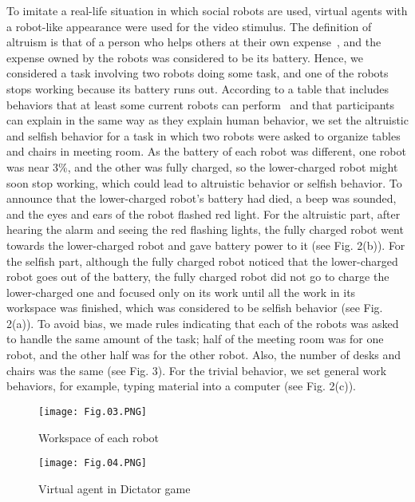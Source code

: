 \documentclass[runningheads]{llncs}
\begin{document}
To imitate a real-life situation in which social robots are used, virtual agents with a robot-like appearance were used for the video stimulus. The definition of altruism is that of a person who helps others at their own expense~\cite{ref_article22}, and the expense owned by the robots was considered to be its battery. Hence, we considered a task involving two robots doing some task, and one of the robots stops working because its battery runs out. According to a table that includes behaviors that at least some current robots can perform~\cite{ref_article35} and that participants can explain in the same way as they explain human behavior, we set the altruistic and selfish behavior for a task in which two robots were asked to organize tables and chairs in meeting room. As the battery of each robot was different, one robot was near 3\%, and the other was fully charged, so the lower-charged robot might soon stop working, which could lead to altruistic behavior or selfish behavior. To announce that the lower-charged robot's battery had died, a beep was sounded, and the eyes and ears of the robot flashed red light. For the altruistic part, after hearing the alarm and seeing the red flashing lights, the fully charged robot went towards the lower-charged robot and gave battery power to it (see Fig. 2(b)). For the selfish part, although the fully charged robot noticed that the lower-charged robot goes out of the battery, the fully charged robot did not go to charge the lower-charged one and focused only on its work until all the work in its workspace was finished, which was considered to be selfish behavior (see Fig. 2(a)). To avoid bias, we made rules indicating that each of the robots was asked to handle the same amount of the task; half of the meeting room was for one robot, and the other half was for the other robot. Also, the number of desks and chairs was the same (see Fig. 3). For the trivial behavior, we set general work behaviors, for example, typing material into a computer (see Fig. 2(c)).



\begin{figure}[tb]
\centering
\begin{minipage}{.5\textwidth}
\centering\texttt{[image: Fig.03.PNG]}
\caption{Workspace of each robot} \label{fig3}
  \label{fig:test1}
\end{minipage}%
\begin{minipage}{.5\textwidth}
  \centering
\texttt{[image: Fig.04.PNG]}
\caption{Virtual agent in Dictator game } \label{fig4}
  \label{fig:test2}
\end{minipage}
\end{figure}
\end{document}
